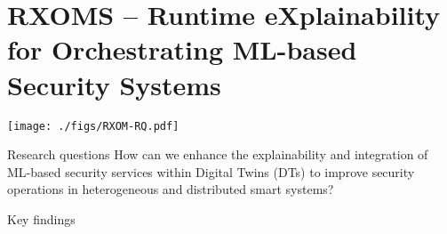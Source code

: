 \documentclass[landscape,a0,final]{a0poster} %
\newcommand{\sectionspace}{10mm} %
\begin{document}
\begin{minipage}{0.98\linewidth}
\begin{minipage}[t]{0.3\linewidth}
\end{minipage}
\hspace{0.03\linewidth} %
\begin{minipage}[t]{0.3\linewidth}
\setlength{\parindent}{10mm} %
\vspace{\sectionspace}
\section{RXOMS -- Runtime eXplainability for Orchestrating ML-based Security Systems}
\vspace{-30pt}
\begin{center}
\texttt{[image: ./figs/RXOM-RQ.pdf]}
\end{center}
\begin{myframe}{Research questions}
  How can we enhance the explainability and integration of ML-based security services within Digital Twins (DTs) to improve security operations in heterogeneous and distributed smart systems?
\end{myframe}
\begin{myframe}{Key findings}
\begin{itemize}

\end{itemize}
\end{myframe}
\end{minipage}
\end{minipage}
\end{document}
